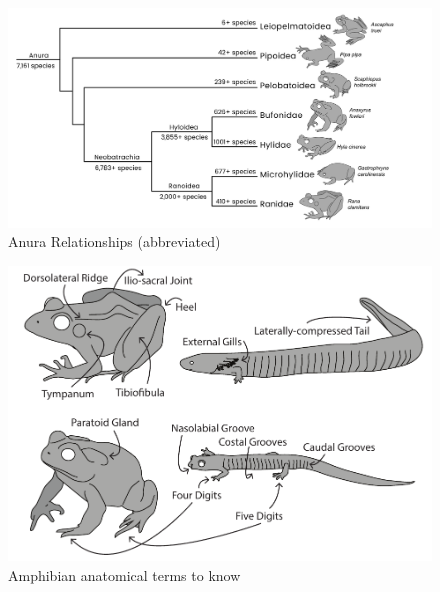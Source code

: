 \documentclass[a4paper,12pt]{article}
\begin{document}
\begin{figure}[h]
\centering
  \includegraphics[scale=0.3]{Anura_tre.pdf}
  \caption{Anura Relationships (abbreviated)}
  \label{fig:Anura}
\end{figure}

\begin{figure}[h]
\centering
  \includegraphics{AmphibianAnatomy.pdf}
  \caption{Amphibian anatomical terms to know}
  \label{fig:Anura}
\end{figure}
\end{document}
